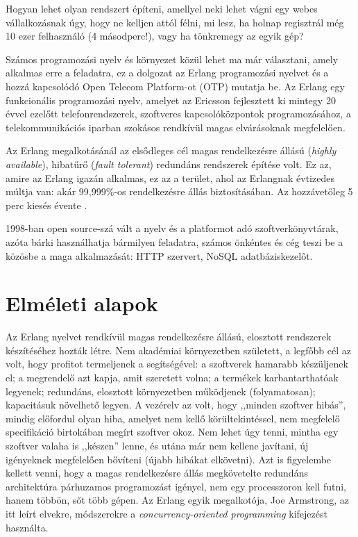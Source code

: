 \documentclass[12pt, a4paper, oneside]{book}
\begin{document}
Hogyan lehet olyan rendszert építeni, amellyel neki lehet vágni egy webes
vállalkozásnak úgy, hogy ne kelljen attól félni, mi lesz, ha holnap regisztrál
még 10 ezer felhasználó (4 másodperc!), vagy ha tönkremegy az egyik gép?

Számos programozási nyelv és környezet közül lehet ma már választani, amely
alkalmas erre a feladatra, ez a dolgozat az Erlang programozási nyelvet és a
hozzá kapcsolódó Open Telecom Platform-ot (OTP) mutatja be. Az Erlang egy
funkcionális programozási nyelv, amelyet az Ericsson fejlesztett ki mintegy 20
évvel ezelőtt telefonrendszerek, szoftveres kapcsolóközpontok programozásához,
a telekommunikációs iparban szokásos rendkívül magas elvárásoknak megfelelően. 

Az Erlang megalkotásánál az elsődleges cél magas rendelkezésre állású
(\emph{highly available}), hibatűrő (\emph{fault tolerant}) redundáns
rendszerek építése volt. Ez az, amire az Erlang igazán alkalmas, ez az a
terület, ahol az Erlangnak évtizedes múltja van: akár 99,999\%-os
rendelkezésre állás biztosításában. Az hozzávetőleg 5 perc kiesés
évente \citep{WikipediaNines}.

1998-ban open source-szá vált a nyelv és a platformot adó
szoftverkönyvtárak, azóta bárki használhatja bármilyen feladatra, számos
önkéntes és cég teszi be a közösbe a maga alkalmazását: HTTP szervert, NoSQL
adatbáziskezelőt.

\newpage

\chapter{Elméleti alapok} 

Az Erlang nyelvet rendkívül magas rendelkezésre állású, elosztott rendszerek
készítéséhez hozták létre. Nem akadémiai környezetben született, a legfőbb cél
az volt, hogy profitot termeljenek a segítségével: a szoftverek hamarabb
készüljenek el; a megrendelő azt kapja, amit szeretett volna; a termékek
karbantarthatóak legyenek; redundáns, elosztott környezetben működjenek
(folyamatosan); kapacitásuk növelhető legyen. A vezérelv az volt, hogy ,,minden
szoftver hibás'', mindig előfordul olyan hiba, amelyet nem kellő
körültekintéssel, nem megfelelő specifikáció birtokában megírt szoftver okoz.
Nem lehet úgy tenni, mintha egy szoftver valaha is ,,készen'' lenne, és utána már
nem kellene javítani, új igényeknek megfelelően bővíteni (újabb hibákat
elkövetni). Azt is figyelembe kellett venni, hogy a magas
rendelkezésre állás megkövetelte redundáns architektúra párhuzamos programozást
igényel, nem egy processzoron kell futni, hanem többön, sőt több gépen. Az
Erlang egyik megalkotója, Joe Armstrong, az itt leírt elvekre, módszerekre a
\emph{concurrency-oriented programming} kifejezést használta.
\end{document}
